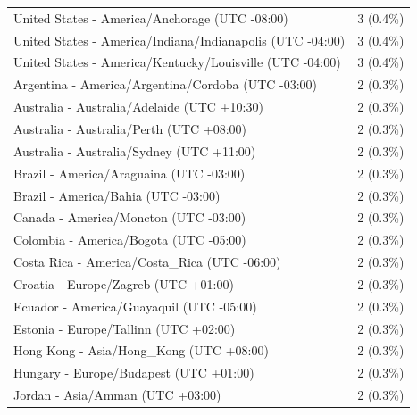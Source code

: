 \documentclass[
  english,
  man]{apa6}
\begin{document}
\begin{appendix}
\begin{table}
{\begin{tabular}[t]{ll}
\hspace{1em}United States - America/Anchorage (UTC -08:00) & 3 (0.4\%)\\
\hspace{1em}United States - America/Indiana/Indianapolis (UTC -04:00) & 3 (0.4\%)\\
\hspace{1em}United States - America/Kentucky/Louisville (UTC -04:00) & 3 (0.4\%)\\
\hspace{1em}Argentina - America/Argentina/Cordoba (UTC -03:00) & 2 (0.3\%)\\
\hspace{1em}Australia - Australia/Adelaide (UTC +10:30) & 2 (0.3\%)\\
\addlinespace
\hspace{1em}Australia - Australia/Perth (UTC +08:00) & 2 (0.3\%)\\
\hspace{1em}Australia - Australia/Sydney (UTC +11:00) & 2 (0.3\%)\\
\hspace{1em}Brazil - America/Araguaina (UTC -03:00) & 2 (0.3\%)\\
\hspace{1em}Brazil - America/Bahia (UTC -03:00) & 2 (0.3\%)\\
\hspace{1em}Canada - America/Moncton (UTC -03:00) & 2 (0.3\%)\\
\addlinespace
\hspace{1em}Colombia - America/Bogota (UTC -05:00) & 2 (0.3\%)\\
\hspace{1em}Costa Rica - America/Costa\_Rica (UTC -06:00) & 2 (0.3\%)\\
\hspace{1em}Croatia - Europe/Zagreb (UTC +01:00) & 2 (0.3\%)\\
\hspace{1em}Ecuador - America/Guayaquil (UTC -05:00) & 2 (0.3\%)\\
\hspace{1em}Estonia - Europe/Tallinn (UTC +02:00) & 2 (0.3\%)\\
\addlinespace
\hspace{1em}Hong Kong - Asia/Hong\_Kong (UTC +08:00) & 2 (0.3\%)\\
\hspace{1em}Hungary - Europe/Budapest (UTC +01:00) & 2 (0.3\%)\\
\hspace{1em}Jordan - Asia/Amman (UTC +03:00) & 2 (0.3\%)\\

\end{tabular}}
\end{table}
\end{appendix}
\end{document}
